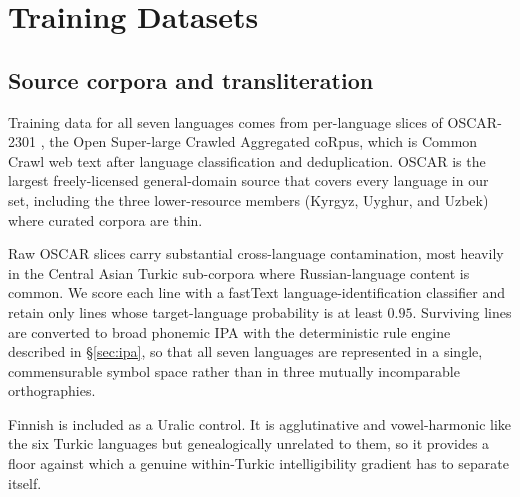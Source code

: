 %

\section{Training Datasets}
\label{sec:data}

\subsection{Source corpora and transliteration}
\label{sec:data-source}

Training data for all seven languages comes from per-language slices of OSCAR-2301 \citep{abadji-etal-2022-towards}, the Open Super-large Crawled Aggregated coRpus, which is Common Crawl web text after language classification and deduplication. OSCAR is the largest freely-licensed general-domain source that covers every language in our set, including the three lower-resource members (Kyrgyz, Uyghur, and Uzbek) where curated corpora are thin.

Raw OSCAR slices carry substantial cross-language contamination, most heavily in the Central Asian Turkic sub-corpora where Russian-language content is common. We score each line with a fastText language-identification classifier \citep{joulin2016bag, joulin2017bag} and retain only lines whose target-language probability is at least $0.95$. Surviving lines are converted to broad phonemic IPA with the deterministic rule engine described in \S\ref{sec:ipa}, so that all seven languages are represented in a single, commensurable symbol space rather than in three mutually incomparable orthographies.

Finnish is included as a Uralic control. It is agglutinative and vowel-harmonic like the six Turkic languages but genealogically unrelated to them, so it provides a floor against which a genuine within-Turkic intelligibility gradient has to separate itself.

